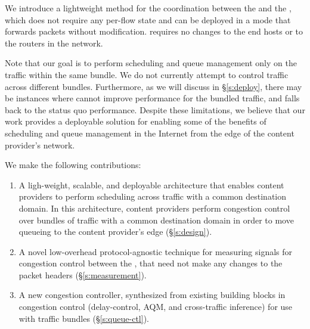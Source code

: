 We introduce a lightweight method for the coordination between the \inbox and the \outbox, which does not require any per-flow state and can be deployed in a mode that forwards packets without modification. \name requires no changes to the end hosts or to the routers in the network.
 
Note that our goal is to perform scheduling and queue management only on the traffic within the same bundle. We do not currently attempt to control traffic across different bundles. 
Furthermore, as we will discuss in \S\ref{s:deploy}, there may be instances where \name cannot improve performance for the bundled traffic, and falls back to the status quo performance. 
Despite these limitations, we believe that our work provides a deployable solution for enabling some of the benefits of scheduling and queue management in the Internet from the edge of the content provider's network.
 
We make the following contributions:
\begin{enumerate}
    \item A ligh-weight, scalable, and deployable architecture that enables content providers to perform scheduling across traffic with a common destination domain. In this architecture, content providers perform congestion control over bundles of traffic with a common destination domain in order to move queueing to the content provider's edge (\S\ref{s:design}).
     \item A novel low-overhead protocol-agnostic technique for measuring signals for congestion control between the \pair, that need not make any changes to the packet headers (\S\ref{s:measurement}).
     \item A new congestion controller, synthesized from existing building blocks in congestion control (delay-control, AQM, and cross-traffic inference) for use with traffic bundles (\S\ref{s:queue-ctl}).
\end{enumerate}
